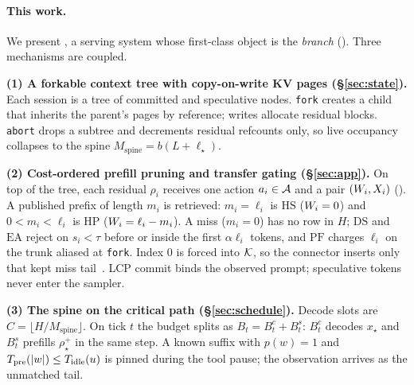 \paragraph{This work.}
We present \sys, a serving system whose first-class object is the \emph{branch} ().
Three mechanisms are coupled.

\smallskip\noindent\textbf{(1) A forkable context tree with copy-on-write KV pages (\S\ref{sec:state}).}
Each session is a tree of committed and speculative nodes.
\texttt{fork} creates a child that inherits the parent's pages by reference; writes allocate residual blocks.
\texttt{abort} drops a subtree and decrements residual refcounts only, so live occupancy collapses to the spine $M_{\mathrm{spine}}=b(L+\ell_\star)$.

\smallskip\noindent\textbf{(2) Cost-ordered prefill pruning and transfer gating (\S\ref{sec:app}).}
On top of the tree, each residual $\rho_i$ receives one action $a_i\in\mathcal{A}$ and a pair $(W_i,X_i)$ ().
A published prefix of length $m_i$ is retrieved: $m_i=\ell_i$ is $\mathrm{HS}$ ($W_i=0$) and $0{<}m_i{<}\ell_i$ is $\mathrm{HP}$ ($W_i=\ell_i-m_i$).
A miss ($m_i=0$) has no row in $H$; $\mathrm{DS}$ and $\mathrm{EA}$ reject on $s_i{<}\tau$ before or inside the first $\alpha\ell_i$ tokens, and $\mathrm{PF}$ charges $\ell_i$ on the trunk aliased at \texttt{fork}.
Index $0$ is forced into $\mathcal{K}$, so the connector inserts only that kept miss tail~\cite{distserve,splitwise}.
LCP commit binds the observed prompt; speculative tokens never enter the sampler.

\smallskip\noindent\textbf{(3) The spine on the critical path (\S\ref{sec:schedule}).}
Decode slots are $C=\lfloor H/M_{\mathrm{spine}}\rfloor$.
On tick $t$ the budget splits as $B_t=B^c_t+B^s_t$: $B^c_t$ decodes $x_\star$ and $B^s_t$ prefills $\rho^{+}_{\star}$ in the same step.
A known suffix with $p(w){=}1$ and $T_{\mathrm{pre}}(|w|)\le T_{\mathrm{idle}}(u)$ is pinned during the tool pause; the observation arrives as the unmatched tail.

